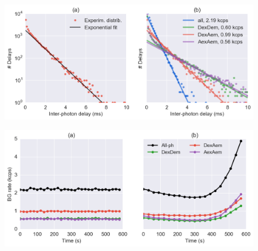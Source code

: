 \begin{figure}
\begin{center}
\includegraphics[width=\doublefig]{"figures/ph_delays_distrib_all/ph_delays_distrib_all"}
\caption[]{}
\end{center}
\end{figure}

\begin{figure}
\begin{center}
\includegraphics[width=\doublefig]{"figures/background_timetrace/background_timetrace"}
\caption[]{}
\end{center}
\end{figure}





